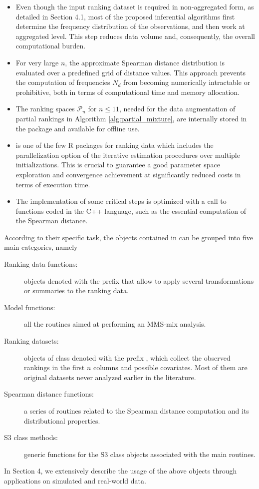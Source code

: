 \begin{itemize}
    \item Even though the input ranking dataset is required in non-aggregated form, as detailed in Section 
    4.1, most of the proposed inferential algorithms first determine the frequency distribution of the observations, and then work at aggregated level. This step reduces data volume and, consequently, the overall computational burden.
    \item For very large $n$, the approximate Spearman distance distribution is evaluated over a predefined grid of distance values. This approach prevents the computation of frequencies $N_d$ from becoming numerically intractable or prohibitive, both in terms of computational time and memory allocation.
    \item The ranking spaces $\mathcal{P}_n$ for $n\leq 11$, needed for the data augmentation of partial rankings in Algorithm \ref{alg:partial_mixture}, are internally stored in the package and available for offline use. 
    \item {} is one of the few \textsf{R} packages for ranking data which includes the parallelization option of the iterative estimation procedures over multiple initializations. This is crucial to guarantee a good parameter space exploration and convergence achievement at significantly reduced costs in terms of execution time.  \item The implementation of some critical steps is optimized with a call to functions coded in the \textsf{C++} language, such as the essential computation of the Spearman distance.
\end{itemize}

According to their specific task, the objects contained in  can be grouped into five main categories, 
namely
\begin{description}
\item[Ranking data functions:] objects denoted with the prefix  that allow to apply several transformations or summaries to the ranking data.
\item[Model functions:] all the routines aimed at performing an MMS-mix analysis.
\item[Ranking datasets:] objects of class  denoted with the prefix , which collect the observed rankings in the first $n$ columns and possible covariates. Most of them are original datasets never analyzed earlier in the literature.
\item[Spearman distance functions:] a series of routines related to the Spearman distance computation and its distributional properties. 
\item[S3 class methods:] generic functions for the S3 class objects associated with the main routines.
\end{description}
%
In Section 
4, we extensively describe the usage of the above objects through applications on simulated and real-world data.

